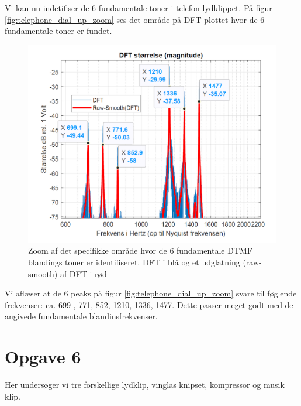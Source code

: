 Vi kan nu indetifiser de 6 fundamentale toner i telefon lydklippet. På figur \autoref{fig:telephone_dial_up_zoom} ses det område på DFT plottet hvor de 6 fundamentale toner er fundet. 

\begin{figure}[H]
\centering
\includegraphics[width=\textwidth]{"figures/opgave5_zoom_1.png"}
\caption{Zoom af det specifikke område hvor de 6 fundamentale DTMF blandings toner er identifiseret. DFT i blå og et udglatning (raw-smooth) af DFT i rød}
\label{fig:telephone_dial_up_zoom}
\end{figure}

Vi aflæser at de 6 peaks på figur \autoref{fig:telephone_dial_up_zoom} svare til føglende frekvenser: ca. 699 , 771, 852, 1210, 1336, 1477. 
Dette passer meget godt med de angivede fundamentale blandinsfrekvenser. 

\section{Opgave 6}

Her undersøger vi tre forskellige lydklip, vinglas knipset, kompressor og musik klip. 

